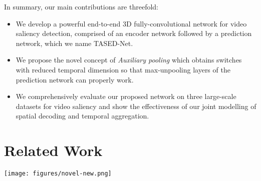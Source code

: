 \documentclass[10pt,twocolumn,letterpaper]{article}
\newcommand{\modelname}{TASED-Net}
\newcommand{\auxpnamet}{Auxiliary pooling}
\newcommand{\auxpname}{\textit{\auxpnamet}}
\begin{document}
In summary, our main contributions are threefold:
\begin{itemize}[noitemsep,nolistsep,before=\vspace{4pt}, after=\vspace{4pt}]
   \item We develop a powerful end-to-end 3D fully-convolutional network for video saliency detection, comprised of an encoder network followed by a prediction network, which we name \modelname{}.
   \item We propose the novel concept of \auxpname{} which obtains switches with reduced temporal dimension so that max-unpooling layers of the prediction network can properly work.
   \item We comprehensively evaluate our proposed network on three large-scale datasets for video saliency and show the effectiveness of our joint modelling of spatial decoding and temporal aggregation.
\end{itemize}
 
\section{Related Work} \label{sec:related}

\begin{figure*}[ht]
  \centering
  \texttt{[image: figures/novel-new.png]}
  \caption{A detailed illustration of our proposed \modelname{} architecture. Violet boxes are convolutional operation blocks taken from the S3D~\cite{xie2018rethinking} network pre-trained on the Kinetics dataset~\cite{kay2017kinetics}. Pink boxes represent spatial decoding blocks. Green boxes are temporal convolutions that reduce the temporal dimension; within these blocks,  and  are set to reduce the temporal size of the output to 1. The  convolutional operation in orange re-distributes the channel information of the encoded features. Because the unpooling layers operate only in spatial dimensions, switches~\cite{zeiler2011adaptive} from the pooling layers cannot be reused. \auxpname{\textit{s}} are used as extra poolings to obtain properly-sized switches for the unpooling layers. Dashed arrows represent switch transfer. Note that \auxpname{\textit{s}} are not included in the main data stream.}
  \label{fig:novel}
\end{figure*}
\end{document}
